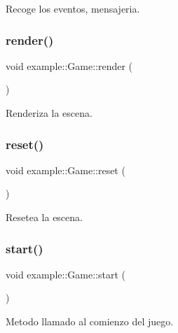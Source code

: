 Recoge los eventos, mensajeria. 

\mbox{\label{classexample_1_1_game_a80ca8afc0d6e9d533d4b7ea0fd333381}} 
\subsubsection{\texorpdfstring{render()}{render()}}
{\footnotesize\ttfamily void example\+::\+Game\+::render (\begin{DoxyParamCaption}{ }\end{DoxyParamCaption})}



Renderiza la escena. 

\mbox{\label{classexample_1_1_game_a3f27f46dd53f8fe477772c2e6bbbef60}} 
\subsubsection{\texorpdfstring{reset()}{reset()}}
{\footnotesize\ttfamily void example\+::\+Game\+::reset (\begin{DoxyParamCaption}{ }\end{DoxyParamCaption})}



Resetea la escena. 

\mbox{\label{classexample_1_1_game_adffce1cd51d04cb325a60f3fb76f1fb1}} 
\subsubsection{\texorpdfstring{start()}{start()}}
{\footnotesize\ttfamily void example\+::\+Game\+::start (\begin{DoxyParamCaption}{ }\end{DoxyParamCaption})}



Metodo llamado al comienzo del juego. 

\mbox{\label{classexample_1_1_game_a01f28031d3b384412bdac6e433171743}} 
